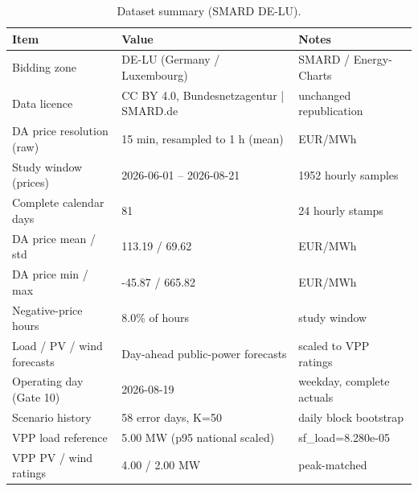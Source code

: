 \begin{table}
\caption{Dataset summary (SMARD DE-LU).}
\label{tab:dataset}
\begin{tabular}{lll}
\toprule
Item & Value & Notes \\
\midrule
Bidding zone & DE-LU (Germany / Luxembourg) & SMARD / Energy-Charts \\
Data licence & CC BY 4.0, Bundesnetzagentur | SMARD.de & unchanged republication \\
DA price resolution (raw) & 15 min, resampled to 1 h (mean) & EUR/MWh \\
Study window (prices) & 2026-06-01 – 2026-08-21 & 1952 hourly samples \\
Complete calendar days & 81 & 24 hourly stamps \\
DA price mean / std & 113.19 / 69.62 & EUR/MWh \\
DA price min / max & -45.87 / 665.82 & EUR/MWh \\
Negative-price hours & 8.0\% of hours & study window \\
Load / PV / wind forecasts & Day-ahead public-power forecasts & scaled to VPP ratings \\
Operating day (Gate 10) & 2026-08-19 & weekday, complete actuals \\
Scenario history & 58 error days, K=50 & daily block bootstrap \\
VPP load reference & 5.00 MW (p95 national scaled) & sf\_load=8.280e-05 \\
VPP PV / wind ratings & 4.00 / 2.00 MW & peak-matched \\
\bottomrule
\end{tabular}
\end{table}


